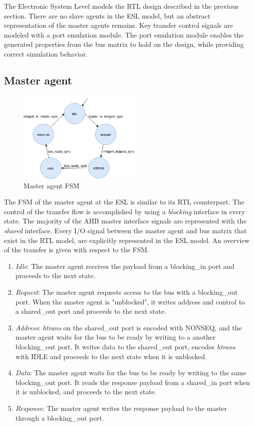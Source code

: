 The Electronic System Level models the RTL design described in the previous section. There are no slave agents in the ESL model, but an abstract representation of the master agents remains. Key transfer control signals are modeled with a port emulation module. The port emulation module enables the generated properties from the bus matrix to hold on the design, while providing correct simulation behavior.  


\subsection{Master agent}
\begin{figure}
\includegraphics[width=6cm]{figs/ESL/mAgent_ESL.png}
\caption{Master agent FSM}\label{fig:eafsm}
\end{figure}
The FSM of the master agent at the ESL is similar to its RTL counterpart. The control of the transfer flow is accomplished by using a \textit{blocking} interface in every state. The majority of the AHB master interface signals are represented with the \textit{shared} interface. Every I/O signal between the master agent and bus matrix that exist in the RTL model, are explicitly represented in the ESL model. An overview of the transfer is given with respect to the FSM. \\
\vspace{0.5cm} 

\begin{enumerate}
 \item \textit{Idle}: The master agent receives the payload from a blocking\_in port and proceeds to the next state.
 \item \textit{Request}: The master agent requests access to the bus with a blocking\_out port. When the master agent is "unblocked", it writes address and control to a shared\_out port and proceeds to the next state.
 \item \textit{Address}: \textit{htrans} on the shared\_out port is encoded with NONSEQ, and the master agent waits for the bus to be ready by writing to a another blocking\_out port. It writes data to the shared\_out port, encodes \textit{htrans} with IDLE and proceeds to the next state when it is unblocked.
 \item \textit{Data}: The master agent waits for the bus to be ready by writing to the same blocking\_out port. It reads the response payload from a shared\_in port when it is unblocked, and proceeds to the next state. 
 \item \textit{Response}: The master agent writes the response payload to the master through a blocking\_out port. 
\end{enumerate} 

